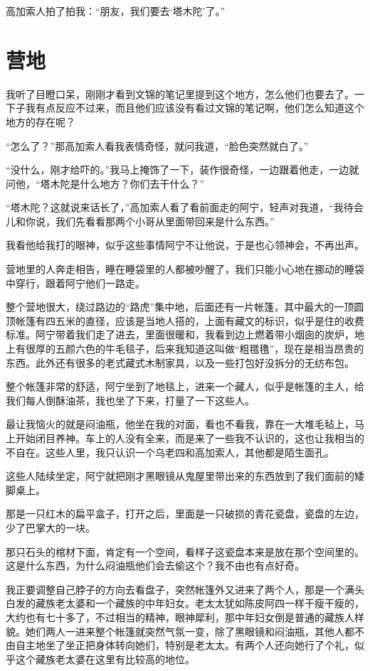 高加索人拍了拍我：“朋友，我们要去‘塔木陀’了。”

\chapter{营地}

我听了目瞪口呆，刚刚才看到文锦的笔记里提到这个地方，怎么他们也要去了。一下子我有点反应不过来，而且他们应该没有看过文锦的笔记啊，他们怎么知道这个地方的存在呢？

“怎么了？”那高加索人看我表情奇怪，就问我道，“脸色突然就白了。”

“没什么，刚才给吓的。”我马上掩饰了一下，装作很奇怪，一边跟着他走，一边就问他，“塔木陀是什么地方？你们去干什么？”

“塔木陀？这就说来话长了，”高加索人看了看前面走的阿宁，轻声对我道，“我待会儿和你说，我们先看看那两个小哥从里面带回来是什么东西。”

我看他给我打的眼神，似乎这些事情阿宁不让他说，于是也心领神会，不再出声。

营地里的人奔走相告，睡在睡袋里的人都被吵醒了，我们只能小心地在挪动的睡袋中穿行，跟着阿宁他们一路走。

整个营地很大，绕过路边的“路虎”集中地，后面还有一片帐篷，其中最大的一顶圆顶帐篷有四五米的直径，应该是当地人搭的，上面有藏文的标识，似乎是住的收费标准。阿宁带着我们走了进去，里面很暖和，我看到边上燃着带小烟囱的炭炉，地上有很厚的五颜六色的牛毛毯子，后来我知道这叫做“粗氆氇”，现在是相当昂贵的东西。此外还有很多的老式藏式木制家具，以及一些打包好没拆分的无纺布包。

整个帐篷非常的舒适，阿宁坐到了地毯上，进来一个藏人，似乎是帐篷的主人，给我们每人倒酥油茶，我也坐了下来，打量了一下这些人。

最让我恼火的就是闷油瓶，他坐在我的对面，看也不看我，靠在一大堆毛毡上，马上开始闭目养神。车上的人没有全来，而是来了一些我不认识的，这也让我相当的不自在。这些人里，我只认识一个乌老四和高加索人，其他都是陌生面孔。

这些人陆续坐定，阿宁就把刚才黑眼镜从鬼屋里带出来的东西放到了我们面前的矮脚桌上。

那是一只红木的扁平盒子，打开之后，里面是一只破损的青花瓷盘，瓷盘的左边，少了巴掌大的一块。

那只石头的棺材下面，肯定有一个空间，看样子这瓷盘本来是放在那个空间里的。这是什么东西，为什么闷油瓶他们会去偷这个？我不由也有点好奇。

我正要调整自己脖子的方向去看盘子，突然帐篷外又进来了两个人，那是一个满头白发的藏族老太婆和一个藏族的中年妇女。老太太犹如陈皮阿四一样干瘦干瘦的，大约也有七十多了，不过相当的精神，眼神犀利，那中年妇女倒是普通的藏族人样貌。她们两人一进来整个帐篷就突然气氛一变，除了黑眼镜和闷油瓶，其他人都不由自主地坐了坐正把身体转向她们，特别是老太太。有两个人还向她行了个礼，似乎这个藏族老太婆在这里有比较高的地位。

